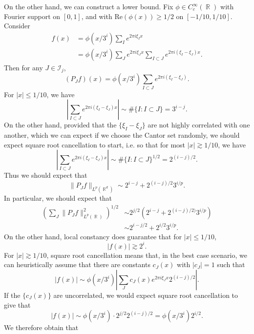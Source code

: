 \documentclass[dvipsnames,letterpaper,12pt]{article}
\numberwithin{equation}{section}
\DeclareMathOperator{\RR}{\mathbb{R}}
\numberwithin{theorem}{section}
\begin{document}
On the other hand, we can construct a lower bound. Fix $\phi \in C_c^\infty(\RR)$ with Fourier support on $[0,1]$, and with $\text{Re}(\phi(x)) \geq 1/2$ on $[-1/10, 1/10]$. Consider
%
\begin{align*}
    f(x) &= \phi(x / 3^i) \sum_I e^{2 \pi i \xi_I x}\\
    &= \phi(x / 3^i) \sum_J e^{2 \pi i \xi_J x} \sum_{I \subset J} e^{2 \pi i (\xi_I - \xi_J) x}.
\end{align*}
Then for any $J \in \mathcal{I}_j$,
%
\[ (P_J f)(x) = \phi(x / 3^i) \sum_{I \subset J} e^{2 \pi i (\xi_I - \xi_J)}. \]
%
For $|x| \leq 1/10$, we have
%
\[ \left| \sum_{I \subset J} e^{2 \pi i (\xi_I - \xi_J) x} \right| \sim \# \{ I : I \subset J \} = 3^{i-j}. \]
%
On the other hand, provided that the $\{ \xi_I - \xi_J \}$ are not highly correlated with one another, which we can expect if we choose the Cantor set randomly, we should expect square root cancellation to start, i.e. so that for most $|x| \gtrsim 1/10$, we have
%
\[ \left| \sum_{I \subset J} e^{2 \pi i (\xi_I - \xi_J) x} \right| \sim \# \{ I : I \subset J \}^{1/2} = 2^{(i-j)/2}. \]
%
Thus we should expect that
\[ \| P_J f \|_{L^p(\RR^d)} \sim 2^{i-j} + 2^{(i-j)/2} 3^{i/p}. \]
%
In particular, we should expect that
%
\begin{align*}
    \left( \sum_J \| P_J f \|_{L^p(\RR)}^2 \right)^{1/2} &\sim 2^{j/2} \left( 2^{i-j} + 2^{(i-j)/2)} 3^{i/p} \right)\\
    &\sim 2^{i-j/2} + 2^{i/2} 3^{i/p}.
\end{align*}
%
On the other hand, local constancy does guarantee that for $|x| \leq 1/10$,
%
\[ |f(x)| \gtrsim 2^i. \]
%
For $|x| \gtrsim 1/10$, square root cancellation means that, in the best case scenario, we can heuristically assume that there are constants $c_J(x)$ with $|c_J| = 1$ such that
%
\[ |f(x)| \sim \phi(x / 3^i) \left| \sum_J c_J(x) e^{2 \pi i \xi_J x} 2^{(i-j)/2} \right|. \]
%
If the $\{ c_J(x) \}$ are uncorrelated, we would expect square root cancellation to give that
%
\[ |f(x)| \sim \phi(x / 3^i) \cdot 2^{j/2} 2^{(i-j)/2} = \phi(x/3^i) 2^{i/2}. \]
%
We therefore obtain that
\end{document}
